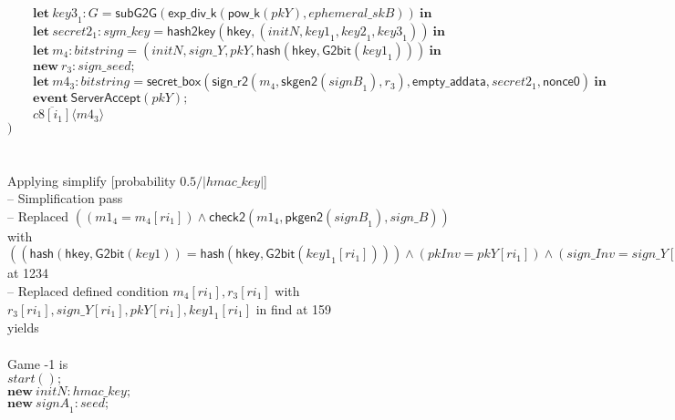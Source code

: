 \documentclass{article}
\newcommand{\cinput}[2]{{#1}({#2})}
\newcommand{\coutput}[2]{\overline{#1}\langle{#2}\rangle}
\newcommand{\kw}[1]{\mathbf{#1}}
\newcommand{\kwf}[1]{\mathsf{#1}}
\newcommand{\var}[1]{\mathit{#1}}
\newcommand{\kwt}[1]{\mathit{#1}}
\newcommand{\kwc}[1]{\mathit{#1}}
\begin{document}
\begin{tabbing}
\>$\quad \quad \kw{let}\ \var{key3}_{1}: \kwt{G} = \kwf{subG2G}(\kwf{exp{\_}div{\_}k}(\kwf{pow{\_}k}(\var{pkY}), \var{ephemeral{\_}skB}))\ \kw{in}$\\
\>$\quad \quad \kw{let}\ \var{secret2}_{1}: \kwt{sym{\_}key} = \kwf{hash2key}(\kwf{hkey}, \kwf{}(\var{initN}, \var{key1}_{1}, \var{key2}_{1}, \var{key3}_{1}))\ \kw{in}$\\
\>$\quad \quad \kw{let}\ \var{m}_{4}: \kwt{bitstring} = \kwf{}(\var{initN}, \var{sign{\_}Y}, \var{pkY}, \kwf{hash}(\kwf{hkey}, \kwf{G2bit}(\var{key1}_{1})))\ \kw{in}$\\
\>$\quad \quad \kw{new}\ \var{r}_{3}: \kwt{sign{\_}seed};$\\
\>$\quad \quad \kw{let}\ \var{m4}_{3}: \kwt{bitstring} = \kwf{secret{\_}box}(\kwf{sign{\_}r2}(\var{m}_{4}, \kwf{skgen2}(\var{signB}_{1}), \var{r}_{3}), \kwf{empty{\_}addata}, \var{secret2}_{1}, \kwf{nonce0})\ \kw{in}$\\
\>$\quad \quad \kw{event}\ \kwf{ServerAccept}(\var{pkY});$\\
\>$\quad \quad \coutput{\kwc{c8}[\var{i}_{1}]}{\var{m4}_{3}}$\\
\>$)$\\
\\
\\
Applying simplify {}[probability $0.5 / |\kwt{hmac{\_}key}|${}]{}\\
\quad -- Simplification pass\\
\qquad -- Replaced $((\var{m1}_{4}  =  \var{m}_{4}[\var{ri}_{1}]) \wedge  \kwf{check2}(\var{m1}_{4}, \kwf{pkgen2}(\var{signB}_{1}), \var{sign{\_}B}))$ with $((\kwf{hash}(\kwf{hkey}, \kwf{G2bit}(\var{key1}))  =  \kwf{hash}(\kwf{hkey}, \kwf{G2bit}(\var{key1}_{1}[\var{ri}_{1}]))) \wedge  (\var{pkInv}  =  \var{pkY}[\var{ri}_{1}]) \wedge  (\var{sign{\_}Inv}  =  \var{sign{\_}Y}[\var{ri}_{1}]) \wedge  \kwf{check2}(\var{m1}_{4}, \kwf{pkgen2}(\var{signB}_{1}), \var{sign{\_}B}))$ at 1234\\
\qquad -- Replaced defined condition $\var{m}_{4}[\var{ri}_{1}], \var{r}_{3}[\var{ri}_{1}]$ with $\var{r}_{3}[\var{ri}_{1}], \var{sign{\_}Y}[\var{ri}_{1}], \var{pkY}[\var{ri}_{1}], \var{key1}_{1}[\var{ri}_{1}]$ in find at 159\\
yields\\
\\
Game -1 is\\
\>$\cinput{\kwc{start}}{};$\\
\>$\kw{new}\ \var{initN}: \kwt{hmac{\_}key};$\\
\>$\kw{new}\ \var{signA}_{1}: \kwt{seed};$\\

\end{tabbing}
\end{document}

